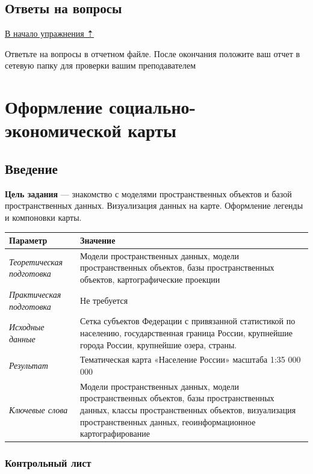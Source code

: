 \documentclass[]{book}
\theoremstyle{definition}
\theoremstyle{definition}
\theoremstyle{definition}
\theoremstyle{remark}
\begin{document}
\hypertarget{map-design-climates-questions}{%
\section{Ответы на вопросы}\label{map-design-climates-questions}}

\protect\hyperlink{map-design-climates}{В начало упражнения ⇡}

Ответьте на вопросы в отчетном файле. После окончания положите ваш отчет
в сетевую папку для проверки вашим преподавателем

\hypertarget{map-design-economic}{%
\chapter{Оформление социально-экономической
карты}\label{map-design-economic}}

\hypertarget{map-design-economic-intro}{%
\section{Введение}\label{map-design-economic-intro}}

\textbf{Цель задания} --- знакомство с моделями пространственных
объектов и базой пространственных данных. Визуализация данных на карте.
Оформление легенды и компоновки карты.

\begin{longtable}[]{@{}ll@{}}
\toprule
Параметр & Значение\tabularnewline
\midrule
\endhead
\emph{Теоретическая подготовка} & Модели пространственных данных, модели
пространственных объектов, базы пространственных объектов,
картографические проекции\tabularnewline
\emph{Практическая подготовка} & Не требуется\tabularnewline
\emph{Исходные данные} & Сетка субъектов Федерации с привязанной
статистикой по населению, государственная граница России, крупнейшие
города России, крупнейшие озера, страны.\tabularnewline
\emph{Результат} & Тематическая карта «Население России» масштаба 1:35
000 000\tabularnewline
\emph{Ключевые слова} & Модели пространственных данных, модели
пространственных объектов, базы пространственных данных, классы
пространственных объектов, визуализация пространственных данных,
геоинформационное картографирование\tabularnewline
\bottomrule
\end{longtable}

\hypertarget{map-design-economic-control}{%
\subsection{Контрольный лист}\label{map-design-economic-control}}
\end{document}

